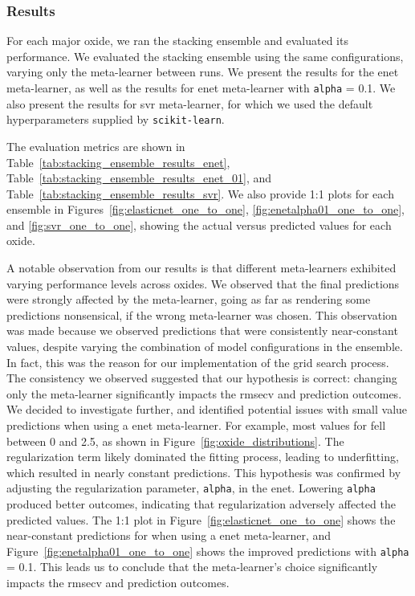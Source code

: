 \subsubsection{Results}\label{subsec:stacking_ensemble_results}
For each major oxide, we ran the stacking ensemble and evaluated its performance.
We evaluated the stacking ensemble using the same configurations, varying only the meta-learner between runs.
We present the results for the \gls{enet} meta-learner, as well as the results for \gls{enet} meta-learner with \texttt{alpha} = 0.1.
We also present the results for \gls{svr} meta-learner, for which we used the default hyperparameters supplied by \texttt{scikit-learn}.

The evaluation metrics are shown in Table~\ref{tab:stacking_ensemble_results_enet}, Table~\ref{tab:stacking_ensemble_results_enet_01}, and Table~\ref{tab:stacking_ensemble_results_svr}.
We also provide 1:1 plots for each ensemble in Figures~\ref{fig:elasticnet_one_to_one}, \ref{fig:enetalpha01_one_to_one}, and \ref{fig:svr_one_to_one}, showing the actual versus predicted values for each oxide.

A notable observation from our results is that different meta-learners exhibited varying performance levels across oxides.
We observed that the final predictions were strongly affected by the meta-learner, going as far as rendering some predictions nonsensical, if the wrong meta-learner was chosen.
This observation was made because we observed  predictions that were consistently near-constant values, despite varying the combination of model configurations in the  ensemble.
In fact, this was the reason for our implementation of the grid search process.
The consistency we observed suggested that our hypothesis is correct: changing only the meta-learner significantly impacts the \gls{rmsecv} and prediction outcomes.
We decided to investigate further, and identified potential issues with small value predictions when using a \gls{enet} meta-learner.
For example, most values for  fell between 0 and 2.5, as shown in Figure~\ref{fig:oxide_distributions}.
The regularization term likely dominated the fitting process, leading to underfitting, which resulted in nearly constant predictions.
This hypothesis was confirmed by adjusting the regularization parameter, \texttt{alpha}, in the \gls{enet}.
Lowering \texttt{alpha} produced better outcomes, indicating that regularization adversely affected the predicted values.
The 1:1 plot in Figure~\ref{fig:elasticnet_one_to_one} shows the near-constant predictions for  when using a \gls{enet} meta-learner, and Figure~\ref{fig:enetalpha01_one_to_one} shows the improved predictions with \texttt{alpha} = 0.1.
This leads us to conclude that the meta-learner's choice significantly impacts the \gls{rmsecv} and prediction outcomes.

